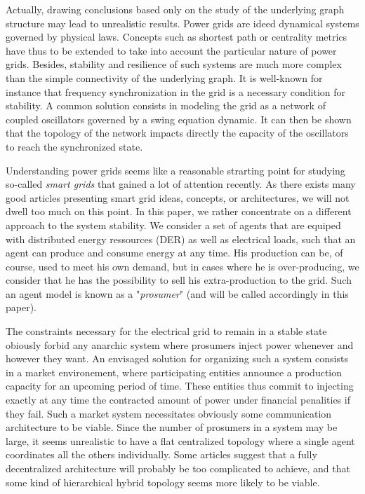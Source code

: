 \documentclass[conference]{IEEEtran}
\begin{document}
Actually, drawing conclusions based only on the study of the underlying graph structure may lead to unrealistic results. Power grids are ideed dynamical systems governed by physical laws. Concepts such as shortest path or centrality metrics have thus to be extended to take into account the particular nature of power grids. Besides, stability and resilience of such systems are much more complex than the simple connectivity of the underlying graph. It is well-known for instance that frequency synchronization in the grid is a necessary condition for stability. A common solution consists in modeling the grid as a network of coupled oscillators governed by a swing equation dynamic. It can then be shown that the topology of the network impacts directly the capacity of the oscillators to reach the synchronized state.

Understanding power grids seems like a reasonable strarting point for studying so-called \textit{smart grids} that gained a lot of attention recently. As there exists many good articles presenting smart grid ideas, concepts, or architectures, we will not dwell too much on this point. In this paper, we rather concentrate on a different approach to the system stability. We consider a set of agents that are equiped with distributed energy ressources (DER) as well as electrical loads, such that an agent can produce and consume energy at any time. His production can be, of course, used to meet his own demand, but in cases where he is over-producing, we consider that he has the possibility to sell his extra-production to the grid. Such an agent model is known as a "\textit{prosumer}" (and will be called accordingly in this paper). 

The constraints necessary for the electrical grid to remain in a stable state obiously forbid any anarchic system where prosumers inject power whenever and however they want. An envisaged solution for organizing such a system consists in a market environement, where participating entities announce a production capacity for an upcoming period of time. These entities thus commit to injecting exactly at any time the contracted amount of power under financial penalities if they fail. Such a market system necessitates obviously some communication architecture to be viable. Since the number of prosumers in a system may be large, it seems unrealistic to have a flat centralized topology where a single agent coordinates all the others individually. Some articles suggest that a fully decentralized architecture will probably be too complicated to achieve, and that some kind of hierarchical hybrid topology seems more likely to be viable.
\end{document}
